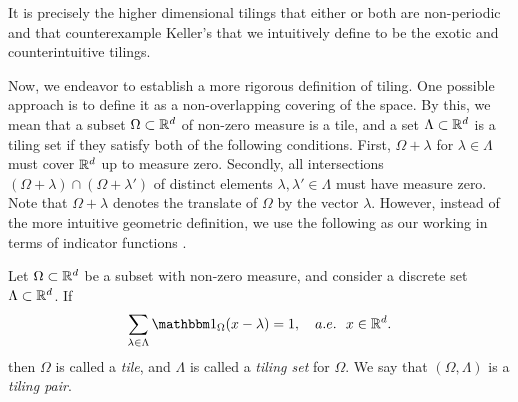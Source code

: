 \documentclass[../thesis.tex]{subfiles}
\begin{document}
It is precisely the higher dimensional tilings that either or both are non-periodic and that counterexample Keller's  that we intuitively define to be the exotic and counterintuitive tilings.


Now, we endeavor to establish a more rigorous definition of tiling. One possible approach is to define it as a non-overlapping covering of the space. By this, we mean that a subset $\Omega \subset \mathbb{R}^d$ of non-zero measure is a tile, and a set $\Lambda \subset \mathbb{R}^d$ is a tiling set if they satisfy both of the following conditions. First, $\Omega+\lambda$ for $\lambda \in \Lambda$ must cover $\mathbb{R}^d$ up to measure zero. Secondly, all intersections $(\Omega+\lambda) \cap (\Omega+\lambda')$ of distinct elements $\lambda,\lambda' \in \Lambda$ must have measure zero. Note that $\Omega+\lambda$ denotes the translate of $\Omega$ by the vector $\lambda$. However, instead of the more intuitive geometric definition, we use the following as our working  in terms of indicator functions \cite{kolountzakisTilingsTranslation2010,kolountzakisStructureTilingsLine1996}.  %
\begin{definition}\label{def:tiling}
    Let $\Omega \subset \mathbb{R}^d$ be a subset with non-zero measure, and consider a discrete set $\Lambda \subset \mathbb{R}^d$. If
    \begin{equation}\label{eq:tiling_set}
        \sum_{\lambda \in \Lambda} \indicator{\Omega}{x-\lambda} = 1, \quad a.e. \text{\space\space} x \in \R^d.
    \end{equation}
    then $\Omega$ is called a \emph{tile}, and $\Lambda$ is called a \emph{tiling set} for $\Omega$. We say that $(\Omega, \Lambda)$ is a \emph{tiling pair}.
\end{definition}
\end{document}
